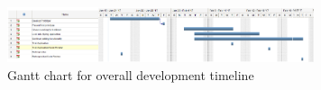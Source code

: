 \begin{figure}[!h]
\begin{center}
\includegraphics[width=9cm]{figures/gantt}
\end{center}
\caption{Gantt chart for overall development timeline}
\label{fig:agilemethod}
\end{figure}
